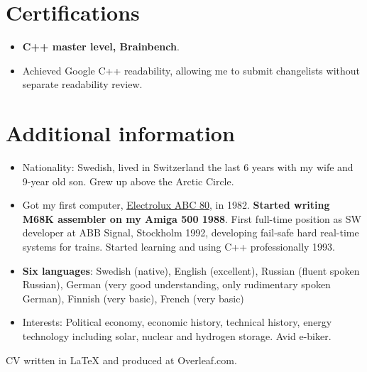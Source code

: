 \documentclass[a4paper,11pt]{article}
\newcommand{\resumeItem}[1]{
  \item\small{#1}
}
\newcommand{\resumeItemListStart}{\begin{itemize}[rightmargin=0.11in]}
\newcommand{\resumeItemListEnd}{\end{itemize}}
\begin{document}



\section{Certifications}
  \resumeItemListStart{}
    \resumeItem{\textbf{C++ master level, Brainbench}.}
    \resumeItem{Achieved Google C++ readability, allowing me to submit changelists without separate readability review.}
  \resumeItemListEnd{}

\section{Additional information}
  \resumeItemListStart{}
    \resumeItem{Nationality: Swedish, lived in Switzerland the last 6 years with my wife and 9-year old son. Grew up above the Arctic Circle.}
    \resumeItem{Got my first computer, \href{https://en.wikipedia.org/wiki/ABC_80}{\uline{Electrolux ABC 80}}, in 1982. \textbf{Started writing M68K assembler on my Amiga 500 1988}. First full-time position as SW developer at ABB Signal, Stockholm 1992, developing fail-safe hard real-time systems for trains. Started learning and using C++ professionally 1993.}
    \resumeItem{\textbf{Six languages}: Swedish (native), English (excellent), Russian (fluent spoken Russian), German (very good understanding, only rudimentary spoken German), Finnish (very basic), French (very basic)}
    \resumeItem{Interests: Political economy, economic history, technical history, energy technology including solar, nuclear and hydrogen storage. Avid e-biker.}
  \resumeItemListEnd{}

CV written in LaTeX and produced at Overleaf.com.
\end{document}
